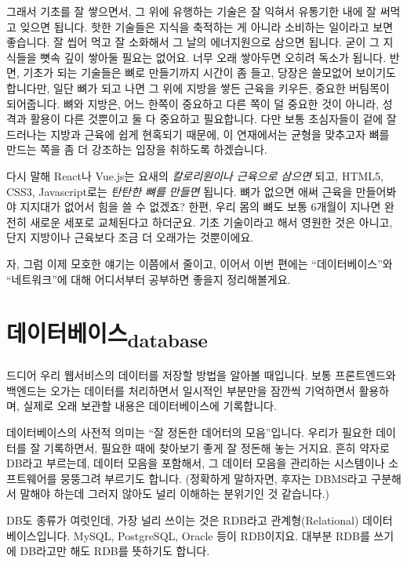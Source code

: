 \documentclass[11pt,a4paper]{article}
\begin{document}
그래서 기초를 잘 쌓으면서, 그 위에 유행하는 기술은 잘 익혀서 유통기한 내에 잘 써먹고 잊으면 됩니다. 핫한 기술들은 지식을 축적하는 게 아니라 소비하는 일이라고 보면 좋습니다. 잘 씹어 먹고 잘 소화해서 그 날의 에너지원으로 삼으면 됩니다. 굳이 그 지식들을 뼛속 깊이 쌓아둘 필요는 없어요. 너무 오래 쌓아두면 오히려 독소가 됩니다. 반면, 기초가 되는 기술들은 뼈로 만들기까지 시간이 좀 들고, 당장은 쓸모없어 보이기도 합니다만, 일단 뼈가 되고 나면 그 위에 지방을 쌓든 근육을 키우든, 중요한 버팀목이 되어줍니다. 뼈와 지방은, 어느 한쪽이 중요하고 다른 쪽이 덜 중요한 것이 아니라, 성격과 활용이 다른 것뿐이고 둘 다 중요하고 필요합니다. 다만 보통 초심자들이 겉에 잘 드러나는 지방과 근육에 쉽게 현혹되기 때문에, 이 연재에서는 균형을 맞추고자 뼈를 만드는 쪽을 좀 더 강조하는 입장을 취하도록 하겠습니다.

다시 말해 \textsf{React나 Vue.js}는 요새의 \emph{칼로리원이나 근육으로 삼으면} 되고, \textsf{HTML5, CSS3, Javascript}로는 \emph{탄탄한 뼈를 만들면} 됩니다. 뼈가 없으면 애써 근육을 만들어봐야 지지대가 없어서 힘을 쓸 수 없겠죠? 한편, 우리 몸의 뼈도 보통 6개월이 지나면 완전히 새로운 세포로 교체된다고 하더군요. 기초 기술이라고 해서 영원한 것은 아니고, 단지 지방이나 근육보다 조금 더 오래가는 것뿐이에요.

자, 그럼 이제 모호한 얘기는 이쯤에서 줄이고, 이어서 이번 편에는 ``데이터베이스''와 ``네트워크''에 대해 어디서부터 공부하면 좋을지 정리해볼게요.

\section[database]{데이터베이스\textsubscript{database}}

드디어 우리 웹서비스의 데이터를 저장할 방법을 알아볼 때입니다. 보통 프론트엔드와 백엔드는 오가는 데이터를 처리하면서 일시적인 부분만을 잠깐씩 기억하면서 활용하며, 실제로 오래 보관할 내용은 데이터베이스에 기록합니다.

데이터베이스의 사전적 의미는 ``잘 정돈한 데어터의 모음''입니다. 우리가 필요한 데이터를 잘 기록하면서, 필요한 때에 찾아보기 좋게 잘 정돈해 놓는 거지요. 흔히 약자로 DB라고 부르는데, 데이터 모음을 포함해서, 그 데이터 모음을 관리하는 시스템이나 소프트웨어를 뭉뚱그려 부르기도 합니다. (정확하게 말하자면, 후자는 DBMS라고 구분해서 말해야 하는데 그러지 않아도 널리 이해하는 분위기인 것 같습니다.)

DB도 종류가 여럿인데, 가장 널리 쓰이는 것은 RDB라고 관계형(Relational) 데이터베이스입니다.  MySQL, PostgreSQL, Oracle 등이 RDB이지요. 대부분 RDB를 쓰기에 DB라고만 해도 RDB를 뜻하기도 합니다.
\end{document}
